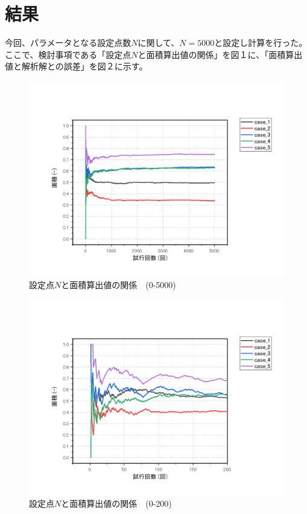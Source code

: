 \documentclass[12pt,a4paper]{jsarticle}
\begin{document}
\section{結果}
今回、パラメータとなる設定点数$N$に関して、$N=5000$と設定し計算を行った。\\
ここで、検討事項である「設定点$N$と面積算出値の関係」を図１に、「面積算出値と解析解との誤差」を図２に示す。
\begin{figure}[htbp]
    \begin{center}
        \includegraphics[width=150mm]{Graph/result_0-5000.png}
        \caption{設定点$N$と面積算出値の関係　(0-5000)}
    \end{center}
\end{figure}
\begin{figure}[htbp]
    \begin{center}
        \includegraphics[width=150mm]{Graph/result_0-200.png}
        \caption{設定点$N$と面積算出値の関係　(0-200)}
    \end{center}
\end{figure}
\end{document}
